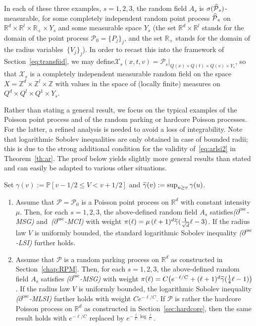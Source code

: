 \documentclass[AHL,Unicode,longabstracts]{cedram}
\newcommand{\R}{\mathbb R}
\newcommand{\Z}{\mathbb Z}
\newcommand{\p}{\mathbb{P}}
\newcommand{\X}{\mathcal X}
\newcommand{\Pc}{\mathcal P}
\newcommand{\osc}{\partial^{\mathrm{osc}}}
\newcommand*{\romanenumi}{\renewcommand*{\theenumi}{\roman{enumi}}}
\let\oldtilde\tilde
\renewcommand*{\tilde}[1]{\mathchoice{\widetilde{#1}}{\widetilde{#1}}{\oldtilde{#1}}{\oldtilde{#1}}}\let\oldhat\hat
\renewcommand*{\hat}[1]{\mathchoice{\widehat{#1}}{\widehat{#1}}{\oldhat{#1}}{\oldhat{#1}}}\let\oldexists\exists
\renewcommand*{\exists}{\mathrel{\oldexists}}
\begin{document}
In each of these three examples, $s=1,2,3$, the random field $A_s$ is $\sigma(\hat\Pc_s)$-measurable, for some completely independent random point process $\hat\Pc_s$ on $\R^d\times \R^l\times\R_+\times Y_s$ and some measurable space $Y_s$ (the set $\R^d\times\R^l$ stands for the domain of the point process $\Pc_0=\{P_j\}_j$, and the set $\R_+$ stands for the domain of the radius variables~$\{V_j\}_j$). In order to recast this into the framework of Section~\ref{eq:transfiid}, we may define\linebreak$\X_s(x,t,v)=\Pc_s|_{Q(x)\times Q(t)\times Q(v)\times Y_s}$, so that $\X_s$ is a completely independent measurable random field on the space $X=\Z^d\times \Z^l\times\Z$ with values in the space of (locally finite) measures on $Q^d\times Q^l\times Q^1\times Y_s$.


Rather than stating a general result, we focus on the typical examples of the Poisson point process and of the random parking or hardcore Poisson processes. For the latter, a refined analysis is needed to avoid a loss of integrability. Note that logarithmic Sobolev inequalities are only obtained in case of bounded radii; this is due to the strong additional condition for the validity of~\eqref{eq:arlsi2} in Theorem~\ref{th:ar}. The proof below yields slightly more general results than stated and can easily be adapted to various other situations. 


\begin{prop}\label{prop:genincl-loss}
Set $\gamma(v):=\p[v-1/2\le V< v+1/2]$ and $\tilde\gamma(v)\linebreak:=\sup_{u\ge v}\gamma(u)$.
\begin{enumerate}\romanenumi
\item \label{prop3.6.1}Assume that $\Pc=\Pc_0$ is a Poisson point process on $\R^d$ with constant intensity $\mu$. Then, for each $s=1,2,3$, the above-defined random field $A_s$ satisfies\linebreak\emph{($\osc$-MSG)} and~\emph{($\osc$-MCI)} with weight $\pi(\ell)=\mu\,(\ell+1)^d\tilde\gamma(\frac1{\sqrt d}\ell-3)$. If the radius law $V$ is uniformly bounded, the standard logarithmic Sobolev inequality \emph{($\osc$-LSI)} further holds.%
\item \label{prop3.6.2}Assume that $\Pc$ is a random parking process on $\R^d$ as constructed in Section~\ref{chap:RPM}. Then, for each $s=1,2,3$, the above-defined random field $A_s$ satisfies \emph{($\osc$-MSG)} with weight $\pi(\ell)=C\big(e^{-\ell/C}+(\ell+1)^d\tilde\gamma(\frac14\ell-1)\big)$. If the radius law $V$ is uniformly bounded, the logarithmic Sobolev inequality \emph{($\osc$-MLSI)} further holds with weight $Ce^{-\ell/C}$. If $\Pc$ is rather the hardcore Poisson process on $\R^d$ as constructed in Section~\ref{sec:hardcore}, then the same result holds with $e^{-\ell/C}$ replaced by $e^{-\frac\ell C\log\frac\ell C}$.

\end{enumerate}
\end{prop}
\end{document}
